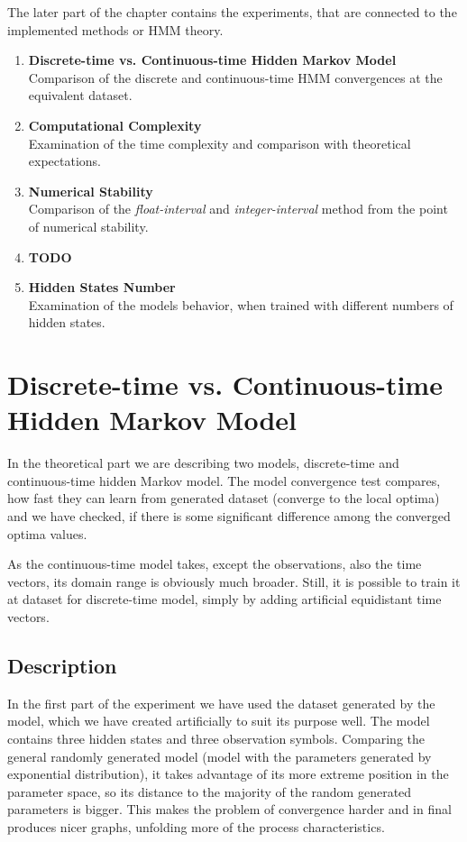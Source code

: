 \documentclass[thesis=M,english]{FITthesis}[2012/10/20]
\begin{document}
The later part of the chapter contains the experiments, that are connected to the implemented methods or HMM theory. %

\begin{enumerate}[resume]
\setcounter{enumi}{0}
\item \textbf{Discrete-time vs. Continuous-time Hidden Markov Model} \\
Comparison of the discrete and continuous-time HMM convergences at the equivalent dataset.
\item \textbf{Computational Complexity} \\
Examination of the time complexity and comparison with theoretical expectations.
\item \textbf{Numerical Stability} \\
Comparison of the \textit{float-interval} and \textit{integer-interval} method from the point of numerical stability.
\item \textbf{TODO}
\item \textbf{Hidden States Number} \\
Examination of the models behavior, when trained with different numbers of hidden states.

\end{enumerate}


\section{Discrete-time vs. Continuous-time Hidden Markov Model}

In the theoretical part we are describing two models, discrete-time and continuous-time hidden Markov model. The model convergence test compares, how fast they can learn from generated dataset (converge to the local optima) and we have checked, if there is some significant difference among the converged optima values. 

As the continuous-time model takes, except the observations, also the time vectors, its domain range is obviously much broader. Still, it is possible to train it at dataset for discrete-time model, simply by adding artificial equidistant time vectors.

\subsection*{ Description }

In the first part of the experiment we have used the dataset generated by the model, which we have created artificially to suit its purpose well. %
The model contains three hidden states and three observation symbols. Comparing the general randomly generated model (model with the parameters generated by exponential distribution), it takes advantage of its more extreme position in the parameter space, so its distance to the majority of the random generated parameters is bigger. This makes the problem of convergence harder and in final produces nicer graphs, unfolding more of the process characteristics.
\end{document}
